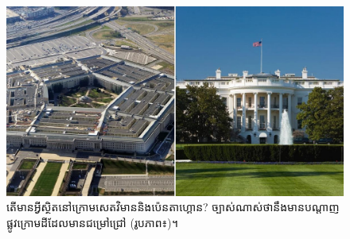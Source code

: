 \documentclass[10pt,twocolumn,letterpaper]{article}
\begin{document}
\begin{figure}[t]
\begin{center}
   \includegraphics[width=1\linewidth]{penta.jpg}
\end{center}
   \caption{តើមានអ្វីស្ថិតនៅក្រោមសេតវិមាននិងប៉េនតាហ្គោន? ច្បាស់ណាស់ថានឹងមានបណ្តាញផ្លូវក្រោមដីដែលមានជម្រៅជ្រៅ (រូបភាព៖\cite{31})។}
\label{fig:3}
\label{fig:onecol}
\end{figure}
\end{document}
